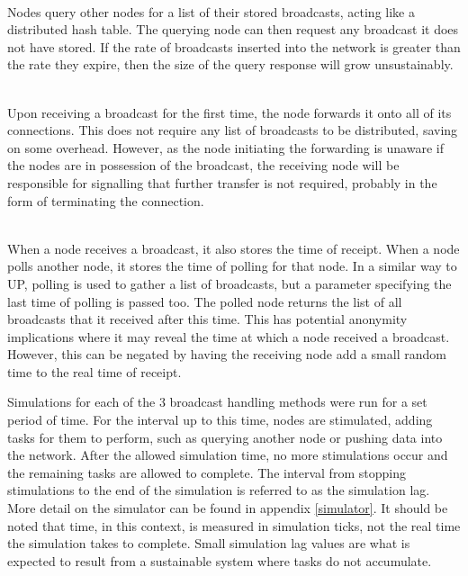 			\begin{description}[topsep=-5pt,itemsep=-1ex,partopsep=2ex,parsep=1.5ex]
				\item[Universal Polling (UP)] \hfill \\
				Nodes query other nodes for a list of their stored broadcasts, acting like a distributed hash table. The querying node can then request any broadcast it does not have stored. If the rate of broadcasts inserted into the network is greater than the rate they expire, then the size of the query response will grow unsustainably.
				\item[Active Forwarding (AF)] \hfill \\
				Upon receiving a broadcast for the first time, the node forwards it onto all of its connections. This does not require any list of broadcasts to be distributed, saving on some overhead. However, as the node initiating the forwarding is unaware if the nodes are in possession of the broadcast, the receiving node will be responsible for signalling that further transfer is not required, probably in the form of terminating the connection.
				\item[Selective Polling (SP)] \hfill \\
				When a node receives a broadcast, it also stores the time of receipt. When a node polls another node, it stores the time of polling for that node. In a similar way to UP, polling is used to gather a list of broadcasts, but a parameter specifying the last time of polling is passed too. The polled node returns the list of all broadcasts that it received after this time. This has potential anonymity implications where it may reveal the time at which a node received a broadcast. However, this can be negated by having the receiving node add a small random time to the real time of receipt.
			\end{description}
			
			Simulations for each of the 3 broadcast handling methods were run for a set period of time. For the interval up to this time, nodes are stimulated, adding tasks for them to perform, such as querying another node or pushing data into the network. After the allowed simulation time, no more stimulations occur and the remaining tasks are allowed to complete. The interval from stopping stimulations to the end of the simulation is referred to as the simulation lag. More detail on the simulator can be found in appendix \ref{simulator}. It should be noted that time, in this context, is measured in simulation ticks, not the real time the simulation takes to complete. Small simulation lag values are what is expected to result from a sustainable system where tasks do not accumulate.
			
